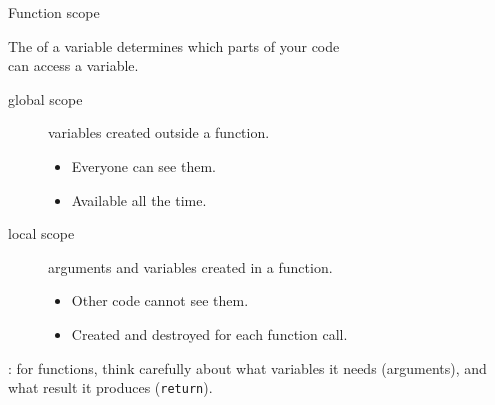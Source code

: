 \documentclass[aspectratio=169,usenames,dvipsnames]{beamer}
\begin{document}
% 
% 
% 

\begin{frame}[fragile]{Function scope}
    \begin{definition}
        The  of a variable determines which parts of your code \\
            can access a variable.
    \end{definition}
    \begin{description}
        \item[global scope] variables created outside a function.
            \begin{itemize}
                \item Everyone can see them.
                \item Available all the time.
            \end{itemize}
        \item[local scope] arguments and variables created in a function.
            \begin{itemize}
                \item Other code cannot see them.
                \item Created and destroyed for each function call.
            \end{itemize}
    \end{description}

    \pause
    : for functions, think carefully about what variables
        it needs (arguments), and what result it produces (\lstinline{return}).
\end{frame}
\end{document}
